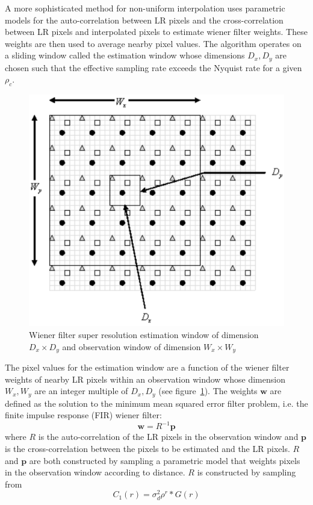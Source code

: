 A more sophisticated method for non-uniform interpolation uses parametric models for the auto-correlation between LR pixels and the cross-correlation between LR pixels and interpolated pixels to estimate wiener filter weights.
%
These weights are then used to average nearby pixel values.
%
The algorithm operates on a sliding window called the estimation window whose dimensions $D_x, D_y$ are chosen such that the effective sampling rate exceeds the Nyquist rate for a given $\rho_c$.
\begin{figure}
    \centering
    \includegraphics[width=.7\linewidth]{figures/wiener.png}
    \caption{Wiener filter super resolution estimation window of dimension $D_x \times D_y$ and observation window of dimension $W_x \times W_y$\cite{wiener}}
    \label{fig:wiener}
\end{figure}
The pixel values for the estimation window are a function of the wiener filter weights of nearby LR pixels within an observation window whose dimension $W_x, W_y$ are an integer multiple of $D_x, D_y$ (see figure~\ref{fig:wiener}).
%
The weights $\bm{w}$ are defined as the solution to the minimum mean squared error filter problem, i.e. the finite impulse response (FIR) wiener filter:
\begin{equation}
    \bm{w} = R^{-1}\bm{p}
\end{equation}
where $R$ is the auto-correlation of the LR pixels in the observation window and $\bm{p}$ is the cross-correlation between the pixels to be estimated and the LR pixels.
%
$R$ and $\bm{p}$ are both constructed by sampling a parametric model that weights pixels in the observation window according to distance.
%
$R$ is constructed by sampling from
\begin{equation}
     C_1(r) = \sigma_{d}^2 \rho^{r} \ast G(r)
\end{equation}
